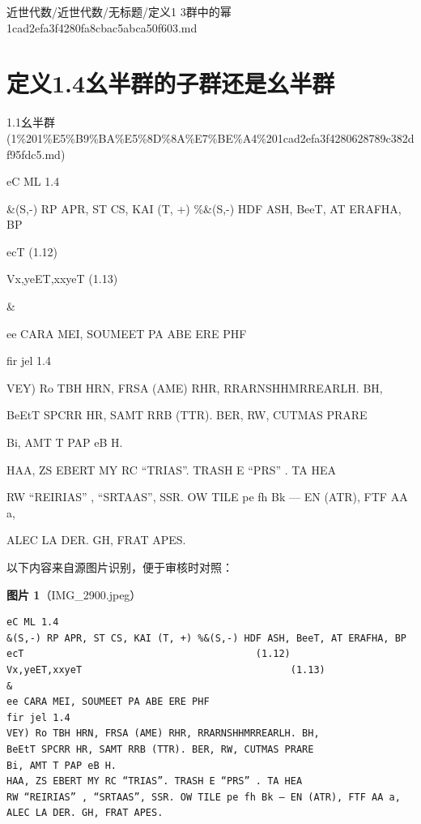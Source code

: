 \begin{note}[来源路径]

近世代数/近世代数/无标题/定义1 3群中的幂 1cad2efa3f4280fa8cbac5abca50f603.md

\end{note}

\section*{定义1.4幺半群的子群还是幺半群}

\begin{note}[来源上级主题]

1.1幺半群 (1\%201\%E5\%B9\%BA\%E5\%8D\%8A\%E7\%BE\%A4\%201cad2efa3f4280628789c382df95fdc5.md)

\end{note}

\begin{definition}[定义1.4幺半群的子群还是幺半群]

eC ML 1.4

\&(S,-) RP APR, ST CS, KAI (T, +) \%\&(S,-) HDF ASH, BeeT, AT ERAFHA, BP

ecT                                        (1.12)

Vx,yeET,xxyeT                                    (1.13)

\&

ee CARA MEI, SOUMEET PA ABE ERE PHF

fir jel 1.4

VEY) Ro TBH HRN, FRSA (AME) RHR, RRARNSHHMRREARLH. BH,

BeEtT SPCRR HR, SAMT RRB (TTR). BER, RW, CUTMAS PRARE

Bi, AMT T PAP eB H.

HAA, ZS EBERT MY RC “TRIAS”. TRASH E “PRS” . TA HEA

RW “REIRIAS” , “SRTAAS”, SSR. OW TILE pe fh Bk — EN (ATR), FTF AA a,

ALEC LA DER. GH, FRAT APES.

\end{definition}

\begin{note}
以下内容来自源图片识别，便于审核时对照：

\textbf{图片 1}（IMG\_2900.jpeg）
\begin{Verbatim}[fontsize=\small]
eC ML 1.4
&(S,-) RP APR, ST CS, KAI (T, +) %&(S,-) HDF ASH, BeeT, AT ERAFHA, BP
ecT                                        (1.12)
Vx,yeET,xxyeT                                    (1.13)
&
ee CARA MEI, SOUMEET PA ABE ERE PHF
fir jel 1.4
VEY) Ro TBH HRN, FRSA (AME) RHR, RRARNSHHMRREARLH. BH,
BeEtT SPCRR HR, SAMT RRB (TTR). BER, RW, CUTMAS PRARE
Bi, AMT T PAP eB H.
HAA, ZS EBERT MY RC “TRIAS”. TRASH E “PRS” . TA HEA
RW “REIRIAS” , “SRTAAS”, SSR. OW TILE pe fh Bk — EN (ATR), FTF AA a,
ALEC LA DER. GH, FRAT APES.
\end{Verbatim}

\end{note}

